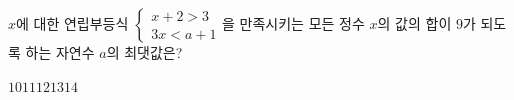 $x$에 대한 연립부등식 $\begin{cases} x+2>3 \\ 3x<a+1 \end{cases}$을 만족시키는 모든 정수 $x$의 값의 합이 $9$가 되도록 하는 자연수 $a$의 최댓값은?
\begin{choices32}{$10$}{$11$}{$12$}{$13$}{$14$}\end{choices32}

